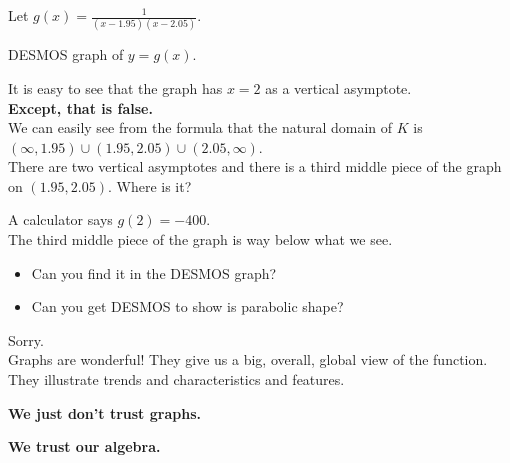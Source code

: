 \documentclass{ximera}
\begin{document}
\begin{example}


Let $g(x) = \frac{1}{(x-1.95)(x-2.05)}$.


DESMOS graph of $y = g(x)$.



\begin{center}
\end{center}



It is easy to see that the graph has $x=2$ as a vertical asymptote. \\

\textbf{\textcolor{red!80!black}{Except, that is false.}} \\

We can easily see from the formula that the natural domain of $K$ is $(\infty, 1.95) \cup (1.95, 2.05) \cup (2.05, \infty)$.\\

There are two vertical asymptotes and there is a third middle piece of the graph on $(1.95, 2.05)$. Where is it?


A calculator says $g(2)=-400$. \\

The third middle piece of the graph is way below what we see.  

\begin{itemize}
\item Can you find it in the DESMOS graph?
\item Can you get DESMOS to show is parabolic shape?
\end{itemize}




\end{example}


Sorry.  \\


Graphs are wonderful!  They give us a big, overall, global view of the function.  They illustrate trends and characteristics and features.


\begin{center}
\textbf{\textcolor{red!80!black}{We just don't trust graphs.}}
\end{center}



\begin{center}
\textbf{\textcolor{blue!55!black}{We trust our algebra.}}
\end{center}
\end{document}
